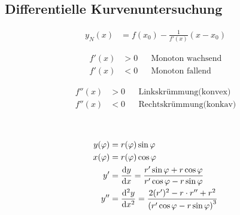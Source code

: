 \subsection{Differentielle Kurvenuntersuchung}


\begin{boxleft}
\end{boxleft}\begin{boxrightshaded}
\begin{align} 
y_N(x)&=f(x_0)-\frac{1}{f'(x)}\left(x-x_0\right)
\end{align}\end{boxrightshaded}

\begin{boxleft}
\end{boxleft}\begin{boxrightshaded}
\begin{align} 
f'(x)&>0&&\text{Monoton wachsend}\\
f'(x)&<0&&\text{Monoton fallend} 
\end{align}\end{boxrightshaded}

\begin{boxleft}
\end{boxleft}\begin{boxrightshaded}
\begin{align} 
f''(x)&>0&&\text{Linkskrümmung(konvex)}\\
f''(x)&<0&&\text{Rechtskrümmung(konkav)} 
\end{align}\end{boxrightshaded}

\begin{boxleft}
\\
\end{boxleft}\begin{boxrightshaded}
\begin{align} 
y(\varphi)&=r(\varphi)\sin\varphi\\
x(\varphi)&=r(\varphi)\cos\varphi\\
y'&=\frac{\mathop{}\!\mathrm{d} y}{\mathop{}\!\mathrm{d} x}=\frac{r'\sin\varphi+r\cos\varphi}{r'\cos\varphi-r\sin\varphi}\\
y''&=\frac{\mathop{}\!\mathrm{d}^2 y}{\mathop{}\!\mathrm{d} x^2}=\frac{2(r')^2-r\cdot r''+r^2}{\left(r'\cos\varphi-r\sin\varphi\right)^3}
\end{align}\end{boxrightshaded}

